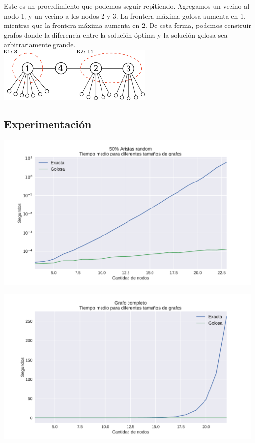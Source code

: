 Este es un procedimiento que podemos seguir repitiendo. Agregamos un vecino al nodo 1, y un vecino a los nodos 2 y 3. La frontera máxima golosa aumenta en 1, mientras que la frontera máxima aumenta en 2. De esta forma, podemos construir grafos donde la diferencia entre la solución óptima y la solución golosa sea arbitrariamente grande. \\

{\centering
    \includegraphics[width=0.57\textwidth]{informe/imgs/greedy_base_nodes_v2.png} \\
}

\subsection{Experimentación}


{\centering
    \includegraphics[width=1\textwidth]{informe/imgs/exp_random50_tiempo_greedy_exacta_logy.pdf} \\
}

{\centering
    \includegraphics[width=1\textwidth]{informe/imgs/exp_completo_tiempo_greedy_exacta.pdf} \\
}

